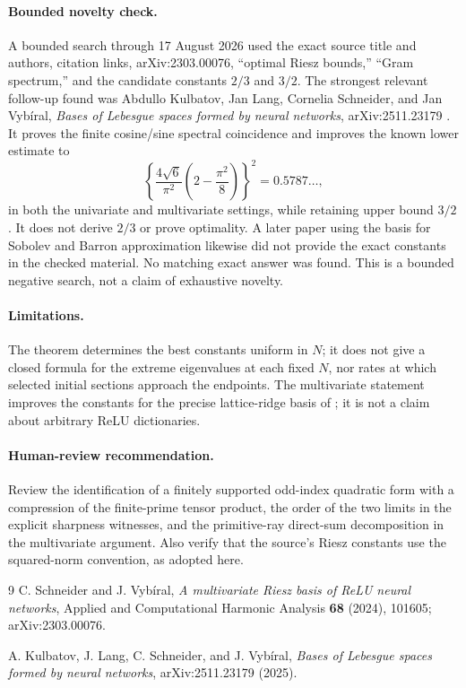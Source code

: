 \documentclass[11pt]{article}
\begin{document}
\paragraph{Bounded novelty check.}
A bounded search through 17 August 2026 used the exact source title and
authors, citation links, arXiv:2303.00076, ``optimal Riesz bounds,'' ``Gram
spectrum,'' and the candidate constants \(2/3\) and \(3/2\).  The strongest
relevant follow-up found was Abdullo Kulbatov, Jan Lang, Cornelia Schneider,
and Jan Vyb\'iral, \emph{Bases of Lebesgue spaces formed by neural networks},
arXiv:2511.23179 \cite{KLSV}.  It proves the finite cosine/sine spectral
coincidence and improves the known lower estimate to
\[
 \left\{\frac{4\sqrt6}{\pi^2}
 \left(2-\frac{\pi^2}{8}\right)\right\}^2
 =0.5787\ldots,
\]
in both the univariate and multivariate settings, while retaining upper bound
\(3/2\).  It does not derive \(2/3\) or prove optimality.  A later paper using
the basis for Sobolev and Barron approximation likewise did not provide the
exact constants in the checked material.  No matching exact answer was found.
This is a bounded negative search, not a claim of exhaustive novelty.

\paragraph{Limitations.}
The theorem determines the best constants uniform in \(N\); it does not give a
closed formula for the extreme eigenvalues at each fixed \(N\), nor rates at
which selected initial sections approach the endpoints.  The multivariate
statement improves the constants for the precise lattice-ridge basis of
\cite{SV}; it is not a claim about arbitrary ReLU dictionaries.

\paragraph{Human-review recommendation.}
Review the identification of a finitely supported odd-index quadratic form
with a compression of the finite-prime tensor product, the order of the two
limits in the explicit sharpness witnesses, and the primitive-ray direct-sum
decomposition in the multivariate argument.  Also verify that the source's
Riesz constants use the squared-norm convention, as adopted here.

\begin{thebibliography}{9}
C. Schneider and J. Vyb\'iral,
\emph{A multivariate Riesz basis of ReLU neural networks},
Applied and Computational Harmonic Analysis \textbf{68} (2024), 101605;
arXiv:2303.00076.

A. Kulbatov, J. Lang, C. Schneider, and J. Vyb\'iral,
\emph{Bases of Lebesgue spaces formed by neural networks},
arXiv:2511.23179 (2025).
\end{thebibliography}
\end{document}
